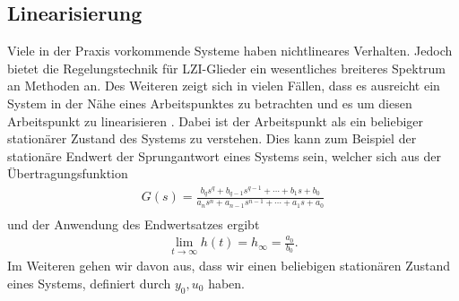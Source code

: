 \subsection{Linearisierung}
%
Viele in der Praxis vorkommende Systeme haben nichtlineares Verhalten. Jedoch bietet die Regelungstechnik für LZI-Glieder ein wesentliches breiteres Spektrum an Methoden an. Des Weiteren zeigt sich in vielen Fällen, dass es ausreicht ein System in der Nähe eines Arbeitspunktes zu betrachten und es um diesen Arbeitspunkt zu linearisieren \cite{Lunze10,MSF05}. Dabei ist der Arbeitspunkt als ein beliebiger stationärer Zustand des Systems zu verstehen. Dies kann zum Beispiel der stationäre Endwert der Sprungantwort eines Systems sein, welcher sich aus der Übertragungsfunktion
%
\begin{equation*}
\begin{aligned}
%
G(s)=\frac{b_{q}s^{q}+b_{q-1}s^{q-1}+\cdots+b_{1}s+b_{0}}{a_{n}s^{n}+a_{n-1}s^{n-1}+\cdots+a_{1}s+a_{0}}\\%
%
\end{aligned}
\end{equation*}
%
und der Anwendung des Endwertsatzes ergibt
%
\begin{equation*}
\begin{aligned}
%
\lim\limits_{t\rightarrow\infty }h(t)=h_{\infty}=\frac{a_{0}}{b_{0}}.
%
\end{aligned}
\end{equation*}
%
Im Weiteren gehen wir davon aus, dass wir einen beliebigen stationären Zustand eines Systems, definiert durch $y_{0},u_{0}$ haben.  
%
